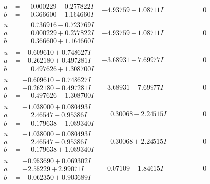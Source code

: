 \documentclass[1p]{elsarticle_modified}
\theoremstyle{definition}
\begin{document}
$$\begin{array}{c|c|c}
\begin{aligned}
a &= \phantom{-}0.000229 - 0.277822 I \\
b &= \phantom{-}0.366600 - 1.164660 I\end{aligned}
 & -4.93759 + 1.08711 I & \phantom{-0.000000 } 0 \\ \hline\begin{aligned}
u &= \phantom{-}0.736916 - 0.723769 I \\
a &= \phantom{-}0.000229 + 0.277822 I \\
b &= \phantom{-}0.366600 + 1.164660 I\end{aligned}
 & -4.93759 - 1.08711 I & \phantom{-0.000000 } 0 \\ \hline\begin{aligned}
u &= -0.609610 + 0.748627 I \\
a &= -0.262180 + 0.497281 I \\
b &= \phantom{-}0.497626 + 1.308700 I\end{aligned}
 & -3.68931 + 7.69977 I & \phantom{-0.000000 } 0 \\ \hline\begin{aligned}
u &= -0.609610 - 0.748627 I \\
a &= -0.262180 - 0.497281 I \\
b &= \phantom{-}0.497626 - 1.308700 I\end{aligned}
 & -3.68931 - 7.69977 I & \phantom{-0.000000 } 0 \\ \hline\begin{aligned}
u &= -1.038000 + 0.080493 I \\
a &= \phantom{-}2.46547 + 0.95386 I \\
b &= \phantom{-}0.179638 - 1.089340 I\end{aligned}
 & \phantom{-}0.30068 - 2.24515 I & \phantom{-0.000000 } 0 \\ \hline\begin{aligned}
u &= -1.038000 - 0.080493 I \\
a &= \phantom{-}2.46547 - 0.95386 I \\
b &= \phantom{-}0.179638 + 1.089340 I\end{aligned}
 & \phantom{-}0.30068 + 2.24515 I & \phantom{-0.000000 } 0 \\ \hline\begin{aligned}
u &= -0.953690 + 0.069302 I \\
a &= -2.55229 + 2.99071 I \\
b &= -0.062350 + 0.903689 I\end{aligned}
 & -0.07109 + 1.84615 I & \phantom{-0.000000 } 0 \\ \hline\begin{aligned}

\end{aligned}
\end{array}$$
\end{document}

